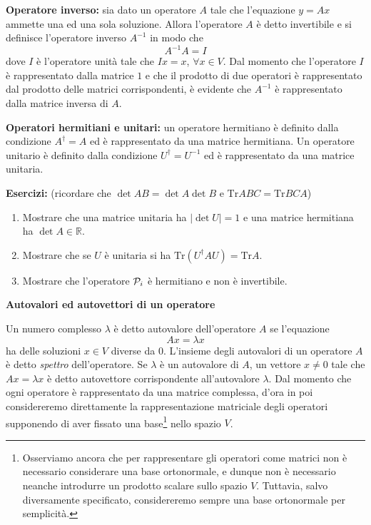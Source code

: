 \documentclass[a4paper,10pt]{article}
\newcommand{\linea}{\vskip14pt \noindent}
\begin{document}
\linea
{\bf Operatore inverso:} sia dato un operatore $A$ tale che l'equazione $y=Ax$ ammette una ed una sola
soluzione. Allora l'operatore $A$ \`e detto invertibile e si definisce l'operatore inverso $A^{-1}$
in modo che
\begin{equation}
A^{-1}A = I
\end{equation}
dove $I$ \`e l'operatore unit\`a tale che $Ix=x$, $\forall x \in V$. Dal momento che l'operatore $I$ 
\`e rappresentato dalla matrice $1$ e che il prodotto di due operatori \`e rappresentato dal prodotto
delle matrici corrispondenti, \`e evidente che $A^{-1}$ \`e rappresentato dalla matrice inversa di $A$.

\linea
{\bf Operatori hermitiani e unitari:} un operatore hermitiano \`e definito dalla condizione $A^\dag=A$
ed \`e rappresentato da una matrice hermitiana. Un operatore unitario \`e definito dalla condizione
$U^\dag = U^{-1}$ ed \`e rappresentato da una matrice unitaria.

\linea
{\bf Esercizi:} (ricordare che $\det AB=\det A\det B$ e $\text{Tr} ABC = \text{Tr} BCA$)
\begin{enumerate}
\item Mostrare che una matrice unitaria ha $|\det U| = 1$ e una matrice hermitiana ha $\det A \in \mathbb{R}$.
\item Mostrare che se $U$ \`e unitaria si ha $\text{Tr} ( U^\dag A U ) = \text{Tr} A$.
\item Mostrare che l'operatore ${\cal P}_i$ \`e hermitiano e non \`e invertibile.
\end{enumerate}





\newpage

\centerline{\bf Autovalori ed autovettori di un operatore}

\linea
Un numero complesso $\lambda$ \`e detto autovalore dell'operatore $A$ se l'equazione
\begin{equation}
Ax=\lambda x
\end{equation}
ha delle soluzioni $x \in V$ diverse da 0. L'insieme degli autovalori di un operatore $A$ \`e detto
{\it spettro} dell'operatore. Se $\lambda$ \`e un autovalore di $A$, un vettore $x \neq 0$ tale che
$Ax=\lambda x$ \`e detto autovettore corrispondente all'autovalore $\lambda$.
\vskip5pt
\noindent
Dal momento che ogni operatore \`e rappresentato da una matrice complessa, d'ora in poi considereremo
direttamente la rappresentazione matriciale degli operatori supponendo di aver fissato una 
base\footnote{Osserviamo ancora che per rappresentare gli operatori come matrici non \`e necessario
considerare una base ortonormale, e dunque non \`e necessario neanche introdurre un prodotto scalare
sullo spazio $V$. Tuttavia, salvo diversamente specificato, considereremo sempre una base ortonormale per
semplicit\`a.} nello spazio $V$.
\end{document}
